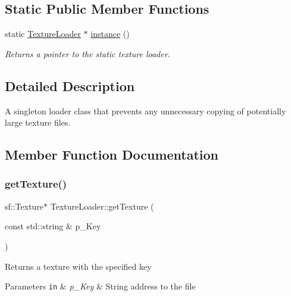 \subsection*{Static Public Member Functions}
\begin{DoxyCompactItemize}
\item 
\mbox{\label{class_texture_loader_a530f60fd59904b00f0847f716afe51ab}} 
static \hyperlink{class_texture_loader}{Texture\+Loader} $\ast$ \hyperlink{class_texture_loader_a530f60fd59904b00f0847f716afe51ab}{instance} ()
\begin{DoxyCompactList}\small\item\em Returns a pointer to the static texture loader. \end{DoxyCompactList}\end{DoxyCompactItemize}


\subsection{Detailed Description}
A singleton loader class that prevents any unnecessary copying of potentially large texture files. 

\subsection{Member Function Documentation}
\mbox{\label{class_texture_loader_ad0e763368d9e1ce26b25819113685b28}} 
\subsubsection{\texorpdfstring{get\+Texture()}{getTexture()}}
{\footnotesize\ttfamily sf\+::\+Texture$\ast$ Texture\+Loader\+::get\+Texture (\begin{DoxyParamCaption}\item[{const std\+::string \&}]{p\+\_\+\+Key }\end{DoxyParamCaption})}

Returns a texture with the specified key 
\begin{DoxyParams}[1]{Parameters}
\mbox{\tt in}  & {\em p\+\_\+\+Key} & String address to the file \\
\hline
\end{DoxyParams}
\mbox{\label{class_texture_loader_a7e9ef47fb129ac6accf99ec1548c3f6a}} 
